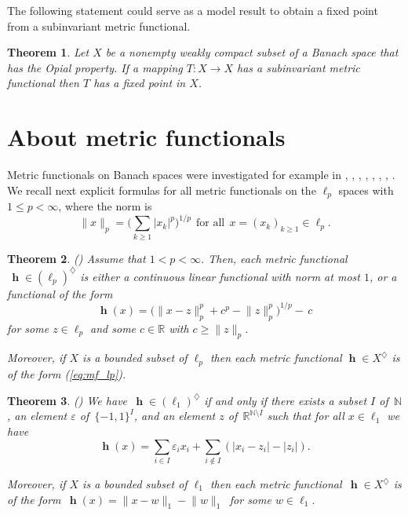 \documentclass[a4paper,12pt]{article}
\newtheorem{theorem}{Theorem}[section]
\theoremstyle{definition}
\numberwithin{equation}{section}
\newcommand{\abs}[1]{\lvert#1\rvert} %
\newcommand{\norm}[1]{\lVert#1\rVert} %
\newcommand{\R}{\mathbb{R}}  %
\newcommand{\N}{\mathbb{N}}  %
\numberwithin{equation}{section}
\DeclareMathOperator{\h}{\mathbf{h}} %
\begin{document}
The following statement could serve as a 
model result to obtain a fixed point from 
a subinvariant metric functional.

\begin{theorem}\label{thm:3} 
Let $X$ be a nonempty weakly compact subset 
of a Banach space that has the Opial property. 
If a mapping $T:X\to X$ has a 
subinvariant metric functional 
then $T$ has a fixed point in $X$.
\end{theorem}
 
\section{About metric functionals}\label{sec:2}

Metric functionals on Banach spaces were 
investigated for example in \cite{Walsh2007}, 
\cite{JS2017}, \cite{Walsh2018},
\cite{Gutierrez2019-1}, \cite{Gutierrez2019-2}, 
\cite{Gutierrez2020}, \cite{LP2023}, 
\cite{CKS2023}. 
We recall next explicit formulas for 
all metric functionals on the $\ell_p$ spaces 
with $1\leq p <\infty$, where the norm is
$$
\norm{x}_p=\Big(\sum_{k\geq 1}\abs{x_k}^p\Big)^{1/p}\ \ 
\text{for all}\ \ x=(x_k)_{k\geq 1}\in \ell_p.
$$

\begin{theorem} 
\textup{(\cite[Section~5]{Gutierrez2019-2})}
\label{AG1}
Assume that $1<p<\infty$. Then, each metric
functional $\,\h\in (\ell_{p})^\diamondsuit$ 
is either a continuous linear functional with 
norm at most $1$, or a functional of the form
\begin{equation}\label{eq:mf_lp}
\h(x) = \big(\norm{x - z}_p^p + c^p 
    -\norm{z}_p^p\big)^{1/p}-\,c 
\end{equation}
for some $z\in\ell_p$ 
and some $c\in\R$ with $c\geq \norm{z}_{p}$.

Moreover, if $X$ is a bounded subset of 
$\ell_p$ then each metric functional 
$\h\in X^\diamondsuit$ is of the form 
\textup{(\ref{eq:mf_lp})}.
\end{theorem}

\begin{theorem}
\textup{(\cite[Section~3]{Gutierrez2019-2})}
We have $\,\h \in (\ell_{1})^\diamondsuit$ if
and only if there exists a subset $I$ of 
$\,\N$, an element $\varepsilon$ of 
$\,\{-1,1\}^I$, and an element $z$ of 
$\,\R^{\N\setminus I}$ such that for all 
$x \in \ell_1$ we have
\begin{equation} \label{eq:mf_l1}
\h(x) = \sum_{i\in I}\varepsilon_ix_i
    + \sum_{i\not\in I}(\abs{x_i-z_i}-\abs{z_i}).
\end{equation}

Moreover, if $X$ is a bounded subset of 
$\ell_{1}$ then each metric functional
$\,\h \in X^\diamondsuit$ is of the form 
$\,\h(x) = \norm{x - w}_{1} - \norm{w}_{1}\,$
for some $w\in\ell_1$.
\end{theorem}
\end{document}
